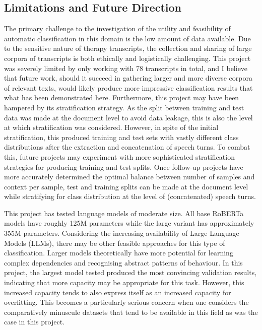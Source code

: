 \documentclass[12pt]{report}
\begin{document}
\subsection{Limitations and Future Direction}
The primary challenge to the investigation of the utility and feasibility of automatic classification in this domain is the low amount of data available.
Due to the sensitive nature of therapy transcripts, the collection and sharing of large corpora of transcripts is both ethically and logistically challenging.
This project was severely limited by only working with 78 transcripts in total, and I believe that future work, should it succeed in gathering larger and more diverse corpora of relevant texts, would likely produce more impressive classification results that what has been demonstrated here.
Furthermore, this project may have been hampered by its stratification strategy.
As the split between training and test data was made at the document level to avoid data leakage, this is also the level at which stratification was considered.
However, in spite of the initial stratification, this produced training and test sets with vastly different class distributions after the extraction and concatenation of speech turns.
To combat this, future projects may experiment with more sophisticated stratification strategies for producing training and test splits.
Once follow-up projects have more accurately determined the optimal balance between number of samples and context per sample, test and training splits can be made at the document level while stratifying for class distribution at the level of (concatenated) speech turns.

This project has tested language models of moderate size. All base RoBERTa models have roughly 125M parameters while the large variant has approximately 355M parameters.
Considering the increasing availability of Large Language Models (LLMs), there may be other feasible approaches for this type of classification.
Larger models theoretically have more potential for learning complex dependencies and recognising abstract patterns of behaviour.
In this project, the largest model tested produced the most convincing validation results, indicating that more capacity may be appropriate for this task.
However, this increased capacity tends to also express itself as an increased capacity for overfitting.
This becomes a particularly serious concern when one considers the comparatively minuscule datasets that tend to be available in this field as was the case in this project.
\end{document}
